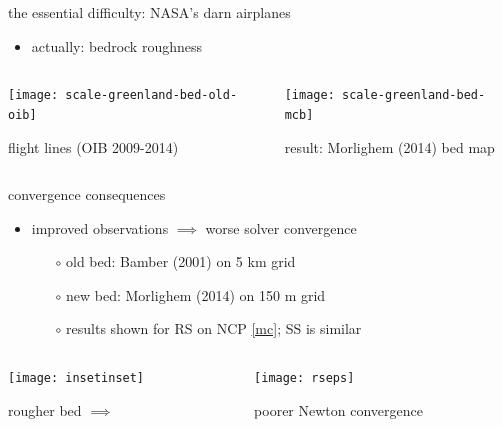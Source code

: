 \documentclass[xcolor={dvipsnames}]{beamer}
\begin{document}
\begin{frame}{the essential difficulty: NASA's darn airplanes}

\begin{itemize}
\item actually: \alert{bedrock roughness}
\end{itemize}

\begin{columns}
\begin{column}{0.5\textwidth}
\hspace{10mm} \texttt{[image: scale-greenland-bed-old-oib]}

\footnotesize \hspace{5mm} flight lines (OIB 2009-2014)
\end{column}
\begin{column}{0.6\textwidth}
\vspace{-8mm}

\hspace{10mm} \texttt{[image: scale-greenland-bed-mcb]} 

\footnotesize result: Morlighem (2014) bed map
\end{column}
\end{columns}

\end{frame}


\begin{frame}{convergence consequences}

\begin{itemize}
\item improved observations $\implies$ worse solver convergence
  \begin{itemize}
  \item[$\circ$] old bed: Bamber (2001) on 5 km grid
  \item[$\circ$] new bed: Morlighem (2014) on 150 m grid
  \item[$\circ$] results shown for RS on NCP \eqref{mc}; SS is similar
  \end{itemize}
\end{itemize}

\begin{columns}
\begin{column}{0.4\textwidth}
\texttt{[image: insetinset]}

rougher bed \hfill $\implies$ \phantom{sddf}
\end{column}
\begin{column}{0.6\textwidth}
\texttt{[image: rseps]}

poorer Newton convergence
\end{column}
\end{columns}
\end{frame}
\end{document}
